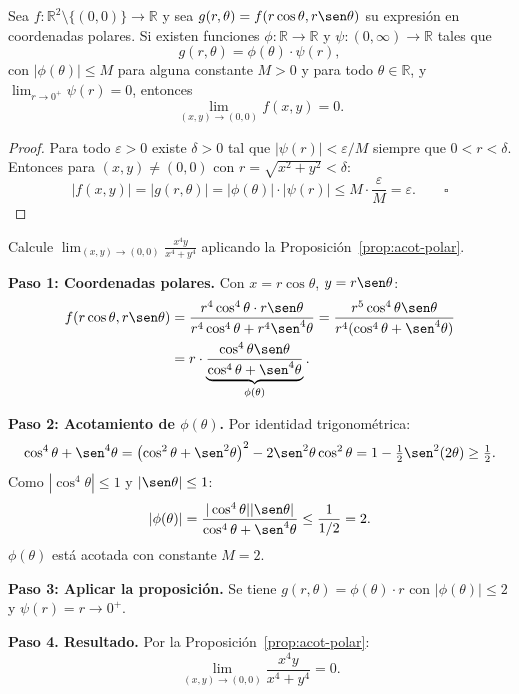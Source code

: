 
\begin{prop}\label{prop:acot-polar}
Sea $f:\mathbb{R}^2\setminus\{(0,0)\}\to\mathbb{R}$ y sea $g(r,\theta)=f(r\cos\theta,r\sen\theta)$ su expresión en coordenadas polares. Si existen funciones $\phi:\mathbb{R}\to\mathbb{R}$ y $\psi:(0,\infty)\to\mathbb{R}$ tales que
\[
  g(r,\theta)=\phi(\theta)\cdot\psi(r),
\]
con $|\phi(\theta)|\leq M$ para alguna constante $M>0$ y para todo $\theta\in\mathbb{R}$, y $\lim_{r\to 0^+}\psi(r)=0$, entonces
\[
  \lim_{(x,y)\to(0,0)}f(x,y)=0.
\]
\begin{proof}
Para todo $\varepsilon>0$ existe $\delta>0$ tal que $|\psi(r)|<\varepsilon/M$ siempre que $0<r<\delta$. Entonces para $(x,y)\neq(0,0)$ con $r=\sqrt{x^2+y^2}<\delta$:
\[
  |f(x,y)|=|g(r,\theta)|=|\phi(\theta)|\cdot|\psi(r)|\leq M\cdot\frac{\varepsilon}{M}=\varepsilon.\qquad\square
\]
\end{proof}
\end{prop}

\begin{prob}
Calcule $\displaystyle\lim_{(x,y)\to(0,0)}\frac{x^4y}{x^4+y^4}$ aplicando la Proposición~\ref{prop:acot-polar}.
\begin{myproof}
\textbf{Paso 1: Coordenadas polares.} Con $x=r\cos\theta$, $y=r\sen\theta$:
\begin{align*}
f(r\cos\theta,r\sen\theta)
  &= \frac{r^4\cos^4\theta\cdot r\sen\theta}{r^4\cos^4\theta+r^4\sen^4\theta}
   = \frac{r^5\cos^4\theta\sen\theta}{r^4(\cos^4\theta+\sen^4\theta)} \\
  &= r\cdot\underbrace{\frac{\cos^4\theta\sen\theta}{\cos^4\theta+\sen^4\theta}}_{\phi(\theta)}.
\end{align*}

\textbf{Paso 2: Acotamiento de $\phi(\theta)$.} Por identidad trigonométrica:
\[
  \cos^4\theta+\sen^4\theta
  = \left(\cos^2\theta+\sen^2\theta\right)^2-2\sen^2\theta\cos^2\theta
  = 1-\tfrac{1}{2}\sen^2(2\theta)\geq\tfrac{1}{2}.
\]
Como $|\cos^4\theta|\leq 1$ y $|\sen\theta|\leq 1$:
\[
  |\phi(\theta)|
  = \frac{|\cos^4\theta||\sen\theta|}{\cos^4\theta+\sen^4\theta}
  \leq \frac{1}{1/2} = 2.
\]
$\phi(\theta)$ está acotada con constante $M=2$.

\textbf{Paso 3: Aplicar la proposición.} Se tiene $g(r,\theta)=\phi(\theta)\cdot r$
con $|\phi(\theta)|\leq 2$ y $\psi(r)=r\to 0^+$.

\textbf{Paso 4. Resultado.} Por la Proposición~\ref{prop:acot-polar}:
\[
  \boxed{\lim_{(x,y)\to(0,0)}\frac{x^4y}{x^4+y^4}=0.}
\]
\end{myproof}
\end{prob}

